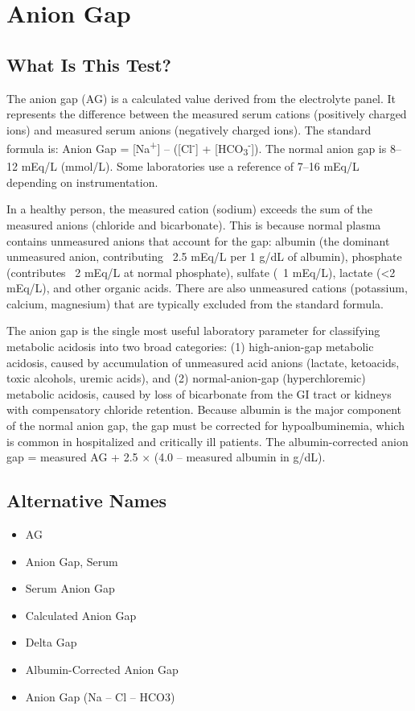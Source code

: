 \chapter{Anion Gap}

\section*{What Is This Test?}
The anion gap (AG) is a calculated value derived from the electrolyte panel. It represents the difference between the measured serum cations (positively charged ions) and measured serum anions (negatively charged ions). The standard formula is: Anion Gap = [Na\textsuperscript{+}] -- ([Cl\textsuperscript{-}] + [HCO\textsubscript{3}\textsuperscript{-}]). The normal anion gap is 8--12 mEq/L (mmol/L). Some laboratories use a reference of 7--16 mEq/L depending on instrumentation.

In a healthy person, the measured cation (sodium) exceeds the sum of the measured anions (chloride and bicarbonate). This is because normal plasma contains unmeasured anions that account for the gap: albumin (the dominant unmeasured anion, contributing ~2.5 mEq/L per 1 g/dL of albumin), phosphate (contributes ~2 mEq/L at normal phosphate), sulfate (~1 mEq/L), lactate (<2 mEq/L), and other organic acids. There are also unmeasured cations (potassium, calcium, magnesium) that are typically excluded from the standard formula.

The anion gap is the single most useful laboratory parameter for classifying metabolic acidosis into two broad categories: (1) high-anion-gap metabolic acidosis, caused by accumulation of unmeasured acid anions (lactate, ketoacids, toxic alcohols, uremic acids), and (2) normal-anion-gap (hyperchloremic) metabolic acidosis, caused by loss of bicarbonate from the GI tract or kidneys with compensatory chloride retention. Because albumin is the major component of the normal anion gap, the gap must be corrected for hypoalbuminemia, which is common in hospitalized and critically ill patients. The albumin-corrected anion gap = measured AG + 2.5 $\times$ (4.0 -- measured albumin in g/dL).

\section*{Alternative Names}
\begin{itemize}
  \item AG
  \item Anion Gap, Serum
  \item Serum Anion Gap
  \item Calculated Anion Gap
  \item Delta Gap
  \item Albumin-Corrected Anion Gap
  \item Anion Gap (Na -- Cl -- HCO3)
\end{itemize}
